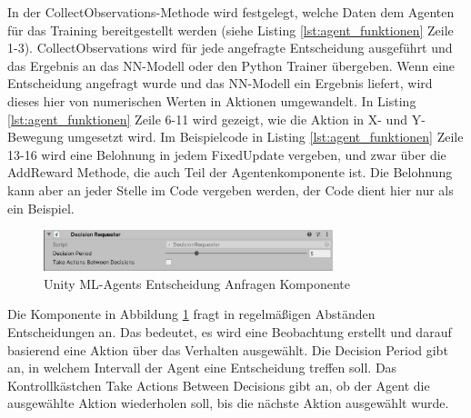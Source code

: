 In der CollectObservations-Methode wird festgelegt, welche Daten dem Agenten für das Training bereitgestellt werden (siehe Listing \ref{lst:agent_funktionen} Zeile 1-3). CollectObservations wird für jede angefragte Entscheidung ausgeführt und das Ergebnis an das NN-Modell oder den Python Trainer übergeben. Wenn eine Entscheidung angefragt wurde und das NN-Modell ein Ergebnis liefert, wird dieses hier von numerischen Werten in Aktionen umgewandelt. In Listing \ref{lst:agent_funktionen} Zeile 6-11 wird gezeigt, wie die Aktion in X- und Y-Bewegung umgesetzt wird. Im Beispielcode in Listing \ref{lst:agent_funktionen} Zeile 13-16 wird eine Belohnung in jedem FixedUpdate vergeben, und zwar über die AddReward Methode, die auch Teil der Agentenkomponente ist. Die Belohnung kann aber an jeder Stelle im Code vergeben werden, der Code dient hier nur als ein Beispiel.

\begin{figure}[H]
  \centering  
  \includegraphics[width=0.75\textwidth]{img/komponente_decision_requester}
  \caption{Unity ML-Agents Entscheidung Anfragen Komponente}
  \label{fig:komponente_decision_requester}
\end{figure}

Die Komponente in Abbildung \ref{fig:komponente_decision_requester} fragt in regelmäßigen Abständen Entscheidungen an. Das bedeutet, es wird eine Beobachtung erstellt und darauf basierend eine Aktion über das Verhalten ausgewählt. Die \grqq{}Decision Period\grqq{} gibt an, in welchem Intervall der Agent eine Entscheidung treffen soll. Das Kontrollkästchen \grqq{}Take Actions Between Decisions\grqq{} gibt an, ob der Agent die ausgewählte Aktion wiederholen soll, bis die nächste Aktion ausgewählt wurde.